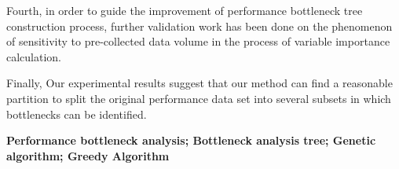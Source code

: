 {Fourth, in order to guide the improvement of performance bottleneck tree construction process, further validation work has been done on the phenomenon of sensitivity to pre-collected data volume in the process of variable importance calculation.

Finally, Our experimental results suggest that our method can find a reasonable partition to split the original performance data set into several subsets in which bottlenecks can be identified.

\textbf{Performance bottleneck analysis; Bottleneck analysis tree; Genetic algorithm; Greedy Algorithm}}
